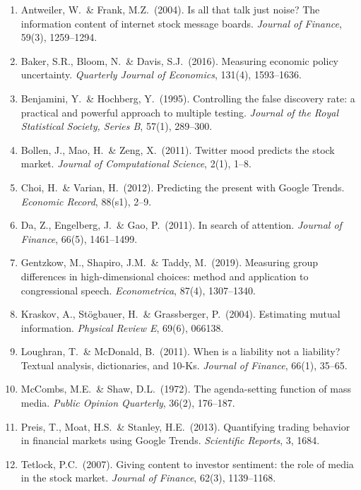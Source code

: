 \documentclass[11pt,a4paper]{article}
\theoremstyle{definition}
\begin{document}
\begin{enumerate}
  \item Antweiler, W.\ \& Frank, M.Z.\ (2004). Is all that talk just noise? The information content of
        internet stock message boards. \textit{Journal of Finance}, 59(3), 1259--1294.

  \item Baker, S.R., Bloom, N.\ \& Davis, S.J.\ (2016). Measuring economic policy uncertainty.
        \textit{Quarterly Journal of Economics}, 131(4), 1593--1636.

  \item Benjamini, Y.\ \& Hochberg, Y.\ (1995). Controlling the false discovery rate: a practical and
        powerful approach to multiple testing. \textit{Journal of the Royal Statistical Society,
        Series B}, 57(1), 289--300.

  \item Bollen, J., Mao, H.\ \& Zeng, X.\ (2011). Twitter mood predicts the stock market.
        \textit{Journal of Computational Science}, 2(1), 1--8.

  \item Choi, H.\ \& Varian, H.\ (2012). Predicting the present with Google Trends.
        \textit{Economic Record}, 88(s1), 2--9.

  \item Da, Z., Engelberg, J.\ \& Gao, P.\ (2011). In search of attention.
        \textit{Journal of Finance}, 66(5), 1461--1499.

  \item Gentzkow, M., Shapiro, J.M.\ \& Taddy, M.\ (2019). Measuring group differences in
        high-dimensional choices: method and application to congressional speech.
        \textit{Econometrica}, 87(4), 1307--1340.

  \item Kraskov, A., St\"ogbauer, H.\ \& Grassberger, P.\ (2004). Estimating mutual information.
        \textit{Physical Review E}, 69(6), 066138.

  \item Loughran, T.\ \& McDonald, B.\ (2011). When is a liability not a liability? Textual analysis,
        dictionaries, and 10-Ks. \textit{Journal of Finance}, 66(1), 35--65.

  \item McCombs, M.E.\ \& Shaw, D.L.\ (1972). The agenda-setting function of mass media.
        \textit{Public Opinion Quarterly}, 36(2), 176--187.

  \item Preis, T., Moat, H.S.\ \& Stanley, H.E.\ (2013). Quantifying trading behavior in financial
        markets using Google Trends. \textit{Scientific Reports}, 3, 1684.

  \item Tetlock, P.C.\ (2007). Giving content to investor sentiment: the role of media in the stock
        market. \textit{Journal of Finance}, 62(3), 1139--1168.
\end{enumerate}
\end{document}
